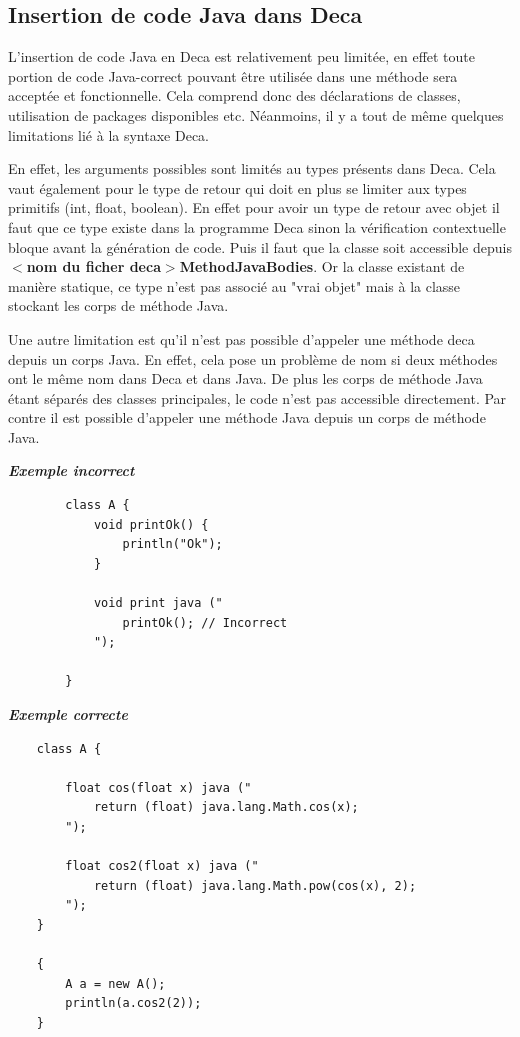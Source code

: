 \documentclass[12pt, a4paper, one side]{article}
\begin{document}
    \subsection{Insertion de code Java dans Deca}
    L'insertion de code Java en Deca est relativement peu limitée, en effet toute portion de code
    Java-correct pouvant être utilisée dans une méthode sera acceptée et fonctionnelle. Cela comprend donc des
    déclarations de classes, utilisation de packages disponibles etc. Néanmoins, il y a tout de même quelques limitations lié à la syntaxe Deca.

    En effet, les arguments possibles sont limités au types présents dans Deca. Cela vaut également
    pour le type de retour qui doit en plus se limiter aux types primitifs (int, float, boolean). En effet
    pour avoir un type de retour avec objet il faut que ce type existe dans la programme Deca sinon
    la vérification contextuelle bloque avant la génération de code. Puis il faut que la classe soit accessible
    depuis \textbf{$<$nom du ficher deca$>$MethodJavaBodies}. Or la classe existant de manière statique, ce type n'est pas
    associé au "vrai objet" mais à la classe stockant les corps de méthode Java.

    Une autre limitation est qu'il n'est pas possible d'appeler une méthode deca depuis un corps Java. En effet, cela
    pose un problème de nom si deux méthodes ont le même nom dans Deca et dans Java. De plus les corps de méthode Java
    étant séparés des classes principales, le code n'est pas accessible directement. Par contre il est possible d'appeler une
    méthode Java depuis un corps de méthode Java.

    \textbf{\textit{Exemple incorrect}}
    \begin{verbatim}
        class A {
            void printOk() {
                println("Ok");
            }

            void print java ("
                printOk(); // Incorrect
            ");

        }
    \end{verbatim}

    \textbf{\textit{Exemple correcte}}
    \begin{verbatim}
    class A {

        float cos(float x) java ("
            return (float) java.lang.Math.cos(x);
        ");

        float cos2(float x) java ("
            return (float) java.lang.Math.pow(cos(x), 2);
        ");
    }

    {
        A a = new A();
        println(a.cos2(2));
    }
    \end{verbatim}
\end{document}
